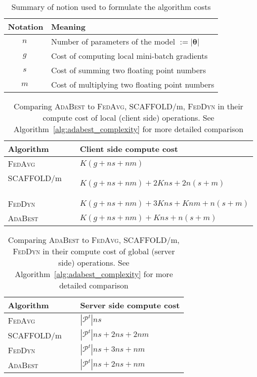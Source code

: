 \documentclass[runningheads]{llncs}
\def\vtheta{{\bm{\theta}}}
\def\gP{{\mathcal{P}}}
\newcommand{\fedavg}{\textsc{FedAvg}\xspace}
\newcommand{\scaffold}{\textsc{SCAFFOLD}\xspace}
\newcommand{\feddyn}{\textsc{FedDyn}\xspace}
\newcommand{\ours}{\textsc{AdaBest}\xspace}
\begin{document}
\begin{table}
\caption{Summary of notion used to formulate the algorithm costs}
\label{tb:cost_notation}
\begin{center}
\begin{small}
\begin{tabular}{c@{\hskip 10pt}l}
\toprule
Notation & Meaning \\
\midrule
$n \ $ & Number of parameters of the model $:=|\vtheta|$ \\
$g \ $ & Cost of computing local mini-batch gradients\\
$s \ $ & Cost of summing two floating point numbers\\
$m \ $ & Cost of multiplying two floating point numbers\\
\bottomrule
\end{tabular}
\end{small}
\end{center}
\end{table} 

\begin{table}
\caption{Comparing \ours to \fedavg, \scaffold/m, \feddyn in their compute cost of local (client side) operations. See Algorithm~\ref{alg:adabest_complexity} for more detailed comparison}
\label{tb:cost_comp_client}
\begin{center}
\begin{tabular}{l@{\hskip 10pt}l}
\toprule
Algorithm & Client side compute cost \\
\midrule
\fedavg \ \  & $K (g + n s + n m)$ \\
\scaffold/m \ \  & $K (g + n s + n m) + 2 K n s + 2n (s+m) $ \\
\feddyn \ \  & $K (g + n s + n m) + 3 K n s + K n m + n (s+m) $ \\
\ours \ \  & $K (g + n s + n m) + K n s + n (s+m) $ \\
\bottomrule
\end{tabular}
\end{center}
\end{table} 

\begin{table}
\caption{Comparing \ours to \fedavg, \scaffold/m, \feddyn in their compute cost of global (server side) operations. See Algorithm~\ref{alg:adabest_complexity} for more detailed comparison}
\label{tb:cost_comp_server}
\begin{center}
\begin{tabular}{l@{\hskip 10pt}l}
\toprule
Algorithm & Server side compute cost \\
\midrule
\fedavg \ \  & $|\gP^t| n s $ \\
\scaffold/m \ \  & $|\gP^t| n s + 2 n s + 2 n m $ \\
\feddyn \ \  & $|\gP^t| n s + 3 n s + n m $ \\
\ours \ \  & $|\gP^t| n s + 2 n s + n m $ \\
\bottomrule
\end{tabular}
\end{center}
\end{table}
 
\end{document}
